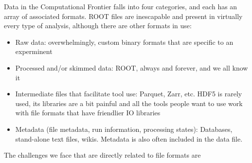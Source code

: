 \begin{comment}
Harrison B. Prosper, Sezen Sekmen, Gokhan Unel. ”Analysis Description Language: A DSL for HEP Analysis”, arXiv:2203.09886 [hep-ph] (pdf). (also relevant to CompF07)~\cite{Prosper:2022lnf}
- emphasizes the need for semantic analysis to make collaboration with theory easier
- also makes an analysis self-documenting (Amy: to a degree)
- prefers a language-independent DSL, an "external DSL" for easier interoperability
- identifies DSL requirements as (1) easily understood by a physicist, (2) unambiguous, (3) domain complete.  I feel like (1) and possibly (2) need more clarification for this to be a true requirement list
- people do use the Analysis Description Language (analysis schools, Future Circular Collider studies), not clear if the use is limited to a specific group or groups, no complete LHC analysis yet
- Obvious enhancement of existing DSL would be to re-write to target LLVM.  (Amy: huh, okay, maybe it is time to think about DSLs?)

C. Backhouse. ”The CAFAna framework for neutrino analysis”, arXiv:2203.13768 [hep-ex] (pdf). (also under NF01)~\cite{arxiv.2203.13768}
- I feel like I need to re-read this paper (Amy)
- ROOT format files
- has been used by multiple neutrino experiments!
- connected with STAN to provide MCMC + analytic derivatives
\end{comment}

Data in the Computational Frontier falls into four categories, and each has an array of associated formats.  ROOT files are inescapable and present in virtually every type of analysis, although there are other formats in use:   

\begin{itemize}
  \item Raw data: overwhelmingly, custom binary formats that are specific to an experminent
  \item Processed and/or skimmed data: ROOT, always and forever, and we all know it
  \item Intermediate files that facilitate tool use: Parquet, Zarr, etc.  HDF5 is rarely used, its libraries are a bit painful and all the tools people want to use work with file formats that have friendlier IO libraries
  \item Metadata (file metadata, run information, processing states): Databases, stand-alone text files, wikis.  Metadata is also often included in the data file.
\end{itemize}

The challenges we face that are directly related to file formats are

